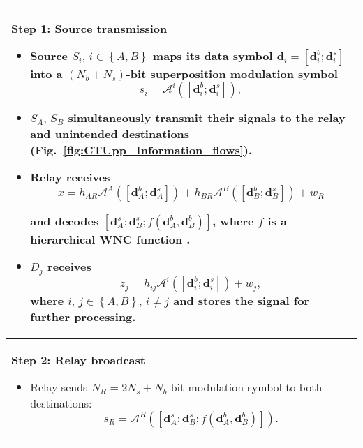 \documentclass{article}
\begin{document}
\begin{table}
\centering{}%
\begin{tabular}{|>{\raggedright}p{}|}
\hline 
\textbf{Step 1: Source transmission}
\begin{itemize}
\item Source $S_{i},\,i\in\left\{ A,B\right\} $ maps its data symbol $\mathbf{d}_{i}=\left[\mathbf{d}_{i}^{b};\mathbf{d}_{i}^{s}\right]$
into a $\left(N_{b}+N_{s}\right)$-bit superposition modulation symbol
\begin{equation}
s_{i}=\mathcal{A}^{i}\left(\left[\mathbf{d}_{i}^{b};\mathbf{d}_{i}^{s}\right]\right),\label{eq:CTUpp_OverallSourceStreams}
\end{equation}

\item $S_{A},\,S_{B}$ simultaneously transmit their signals to the relay
and unintended destinations (Fig.~\ref{fig:CTUpp_Information_flows}).
\item Relay receives
\begin{equation}
x=h_{AR}\mathcal{A}^{A}\left(\left[\mathbf{d}_{A}^{b};\mathbf{d}_{A}^{s}\right]\right)+h_{BR}\mathcal{A}^{B}\left(\left[\mathbf{d}_{B}^{b};\mathbf{d}_{B}^{s}\right]\right)+w_{R}
\end{equation}



and decodes $\left[\mathbf{d}_{A}^{s};\mathbf{d}_{B}^{s};f(\mathbf{d}_{A}^{b},\mathbf{d}_{B}^{b})\right]$,
where $f$ is a hierarchical WNC function \cite{Sykora-Burr_2011-TVT}.

\item $D_{j}$ receives
\begin{equation}
z_{j}=h_{ij}\mathcal{A}^{i}\left(\left[\mathbf{d}_{i}^{b};\mathbf{d}_{i}^{s}\right]\right)+w_{j},\label{eq:CTUpp_Dj_received}
\end{equation}
where $i,\,j\in\left\{ A,B\right\} ,\,i\neq j$ and stores the signal
for further processing.\end{itemize}
\tabularnewline
\hline 
\textbf{Step 2: Relay broadcast}
\begin{itemize}
\item Relay sends $N_{R}=2N_{s}+N_{b}$-bit modulation symbol to both destinations:
\begin{equation}
s_{R}=\mathcal{A}^{R}\left(\left[\mathbf{d}_{A}^{s};\mathbf{d}_{B}^{s};f(\mathbf{d}_{A}^{b},\mathbf{d}_{B}^{b})\right]\right).\label{eq:CTUpp_relay_output}
\end{equation}


\end{itemize}
\end{tabular}
\end{table}
\end{document}
